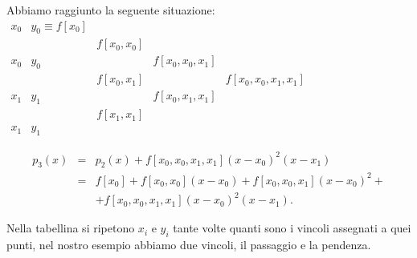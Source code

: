 \begin{itemize}
Abbiamo raggiunto la seguente situazione:\\

$\begin{array}{llllc}
x_0 & y_0 \equiv f[x_0]  &   \\
    &     & f[x_0,x_0] \\
x_0 & y_0  &            & f[x_0,x_0,x_1]  \\
    &     & f[x_0,x_1] &               & f[x_0,x_0,x_1,x_1]\\
x_1 & y_1 &            & f[x_0,x_1,x_1]\\
    &     & f[x_1,x_1]\\
x_1 & y_1
\end{array}$

\[
\begin{array}{lcl}
p_3(x) & = & p_2(x) + f[x_0,x_0,x_1,x_1](x-x_0)^2(x-x_1) \\
       & = & f[x_0] + f[x_0,x_0](x-x_0) + f[x_0,x_0,x_1](x-x_0)^2 +\\
       &   & + f[x_0,x_0,x_1,x_1](x-x_0)^2(x-x_1). 
\end{array}
\]

\begin{osse}
Nella tabellina si ripetono $x_i$ e $y_i$ tante volte quanti sono i vincoli
assegnati a quei punti, nel nostro esempio abbiamo due vincoli, il passaggio
e la pendenza.
\end{osse}
\end{itemize}

